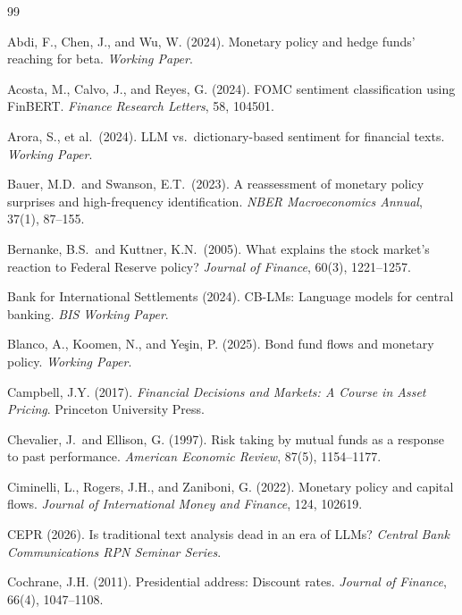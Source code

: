 \documentclass[11pt,a4paper]{article}
\begin{document}

\begin{thebibliography}{99}

Abdi, F., Chen, J., and Wu, W. (2024). Monetary policy and hedge funds' reaching for beta. \textit{Working Paper}.

Acosta, M., Calvo, J., and Reyes, G. (2024). FOMC sentiment classification using FinBERT. \textit{Finance Research Letters}, 58, 104501.

Arora, S., et al.\ (2024). LLM vs.\ dictionary-based sentiment for financial texts. \textit{Working Paper}.

Bauer, M.D.\ and Swanson, E.T.\ (2023). A reassessment of monetary policy surprises and high-frequency identification. \textit{NBER Macroeconomics Annual}, 37(1), 87--155.

Bernanke, B.S.\ and Kuttner, K.N.\ (2005). What explains the stock market's reaction to Federal Reserve policy? \textit{Journal of Finance}, 60(3), 1221--1257.

Bank for International Settlements (2024). CB-LMs: Language models for central banking. \textit{BIS Working Paper}.

Blanco, A., Koomen, N., and Ye\c{s}in, P. (2025). Bond fund flows and monetary policy. \textit{Working Paper}.

Campbell, J.Y. (2017). \textit{Financial Decisions and Markets: A Course in Asset Pricing}. Princeton University Press.

Chevalier, J.\ and Ellison, G. (1997). Risk taking by mutual funds as a response to past performance. \textit{American Economic Review}, 87(5), 1154--1177.

Ciminelli, L., Rogers, J.H., and Zaniboni, G. (2022). Monetary policy and capital flows. \textit{Journal of International Money and Finance}, 124, 102619.

CEPR (2026). Is traditional text analysis dead in an era of LLMs? \textit{Central Bank Communications RPN Seminar Series}.

Cochrane, J.H. (2011). Presidential address: Discount rates. \textit{Journal of Finance}, 66(4), 1047--1108.


\end{thebibliography}
\end{document}
